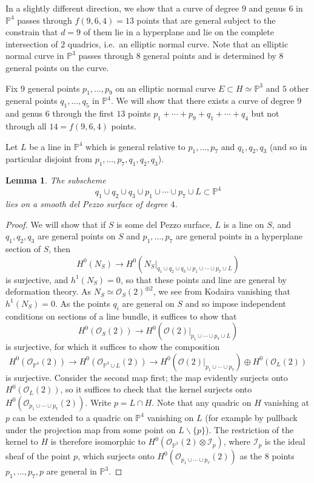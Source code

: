 \documentclass[11pt]{amsart}
\newcommand{\pp}{\mathbb{P}}
\newcommand{\I}{\mathcal{I}}
\renewcommand{\O}{\mathcal{O}}
\newtheorem{lem}[thm]{Lemma}
\theoremstyle{definition}
\theoremstyle{remark}
\begin{document}
In a slightly different direction, we show that a curve of degree $9$ and genus $6$ in $\pp^4$ passes through $f(9,6,4)= 13$ points that are general subject to the constrain that $d=9$ of them lie in a hyperplane and lie on the complete
intersection of $2$ quadrics,
i.e.\ an elliptic normal curve.  Note that an elliptic normal curve in $\pp^3$ passes through $8$ general points and is determined by $8$ general points on the curve.

Fix $9$ general points $p_1, \ldots, p_9$ on an elliptic normal curve $E \subset H \simeq \pp^3$ and $5$ other general points $q_1, \ldots, q_5$ in $\pp^4$.  We will show that there exists a curve of degree $9$ and genus $6$ through the first $13$ points $p_1 + \cdots + p_9 + q_1 + \cdots + q_4$ but not through all $14 = f(9,6,4)$ points.

Let $L$ be a line in $\pp^4$ which is general relative to $p_1 , \ldots, p_7$ and $q_1, q_2, q_3$
(and so in particular disjoint from $p_1, \ldots, p_7, q_1, q_2, q_3$).  

\begin{lem}\label{sm_dP}
The subscheme 
\[q_1 \cup q_2 \cup q_3 \cup p_1 \cup \cdots \cup p_7 \cup L \subset \pp^4\]
lies on a smooth del Pezzo surface of degree $4$.  
\end{lem}
\begin{proof}
We will show that if $S$ is some del Pezzo surface, $L$ is a line on $S$, and $q_1, q_2, q_3$ are general points on $S$ and $p_1, \ldots, p_7$ are general points in a hyperplane section of $S$, then
\[H^0(N_S) \to H^0(N_S|_{q_1 \cup q_2 \cup q_3 \cup p_1 \cup \cdots \cup p_7 \cup L})\]
is surjective, and $h^1(N_S) = 0$, so that these points and line are general by deformation theory.  As $N_S \simeq \O_S(2)^{\oplus 2}$, we see from Kodaira vanishing that $h^1(N_S) = 0$.
As the points $q_i$ are general on $S$ and so impose independent conditions on sections of a line bundle,  it suffices to show that
\[H^0(\O_{S}(2)) \to H^0(\O(2)|_{ p_1 \cup \cdots \cup p_7 \cup L})\]
is surjective, for which it suffices to show the composition
\[H^0(\O_{\pp^4}(2)) \to H^0(\O_{\pp^3 \cup L}(2)) \to H^0(\O(2)|_{ p_1 \cup \cdots \cup p_7}) \oplus H^0(\O_L(2)) \]
is surjective.  Consider the second map first; the map evidently surjects onto $H^0(\O_L(2))$, so it suffices to check that the kernel surjects onto $H^0(\O_{p_1 \cup \cdots \cup p_7}(2))$.
Write $p = L \cap H$. Note that any quadric on $H$ vanishing at $p$ can be extended to a quadric on $\pp^4$
vanishing on $L$ (for example by pullback under the projection map from some point on $L \smallsetminus \{p\}$).
The restriction of the kernel to $H$ is therefore isomorphic to $H^0(\O_{\pp^3}(2) \otimes \I_p)$, where $\I_p$ is the ideal sheaf of the point $p$, which surjects onto $H^0(\O_{p_1 \cup \cdots \cup p_7}(2))$ as the $8$ points $p_1, \ldots, p_7, p$ are general in $\pp^3$.
\end{proof}
\end{document}
